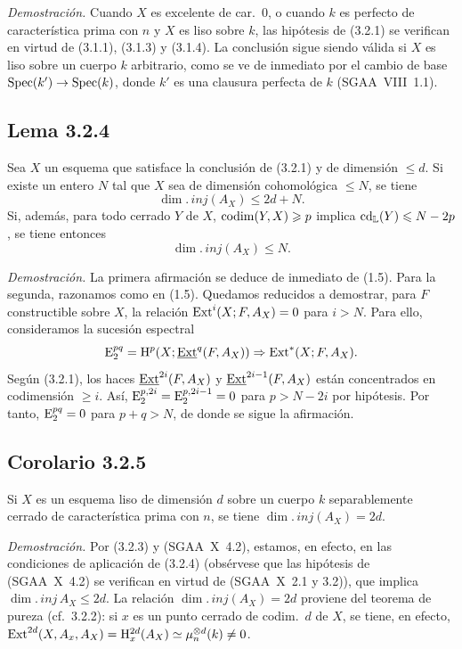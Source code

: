 \emph{Demostración.} Cuando $X$ es excelente de car.~0, o cuando $k$ es perfecto de característica prima con $n$ y $X$ es liso sobre $k$, las hipótesis de (3.2.1) se verifican en virtud de (3.1.1), (3.1.3) y (3.1.4). La conclusión sigue siendo válida si $X$ es liso sobre un cuerpo $k$ arbitrario, como se ve de inmediato por el cambio de base $\operatorname{Spec}(k') \to \operatorname{Spec}(k)$, donde $k'$ es una clausura perfecta de $k$ (SGAA~VIII~1.1).

\subsection*{Lema 3.2.4}
Sea $X$ un esquema que satisface la conclusión de (3.2.1) y de dimensión $\leqslant d$. Si existe un entero $N$ tal que $X$ sea de dimensión cohomológica $\leqslant N$, se tiene
\[
\dim.\,inj(A_X) \leqslant 2d + N.
\]
Si, además, para todo cerrado $Y$ de $X$, $\operatorname{codim}(Y,X) \geqslant p$ implica $\operatorname{cd}_{\mathbb{L}}(Y) \leqslant N - 2p$, se tiene entonces
\[
\dim.\,inj(A_X) \leqslant N.
\]

\emph{Demostración.} La primera afirmación se deduce de inmediato de (1.5). Para la segunda, razonamos como en (1.5). Quedamos reducidos a demostrar, para $F$ constructible sobre $X$, la relación $\operatorname{Ext}^i(X; F, A_X) = 0$ para $i > N$. Para ello, consideramos la sucesión espectral
\[
\mathrm{E}_2^{pq} = \mathrm{H}^p(X; \underline{\operatorname{Ext}}^q(F, A_X)) \Rightarrow \operatorname{Ext}^{*}(X; F, A_X).
\]
Según (3.2.1), los haces $\underline{\operatorname{Ext}}^{2i}(F, A_X)$ y $\underline{\operatorname{Ext}}^{2i-1}(F, A_X)$ están concentrados en codimensión $\geqslant i$. Así, $\mathrm{E}_2^{p,2i} = \mathrm{E}_2^{p,2i-1} = 0$ para $p > N - 2i$ por hipótesis. Por tanto, $\mathrm{E}_2^{pq} = 0$ para $p+q > N$, de donde se sigue la afirmación.

\subsection*{Corolario 3.2.5}
Si $X$ es un esquema liso de dimensión $d$ sobre un cuerpo $k$ separablemente cerrado de característica prima con $n$, se tiene $\dim.\,inj(A_X) = 2d$.

\emph{Demostración.} Por (3.2.3) y (SGAA~X~4.2), estamos, en efecto, en las condiciones de aplicación de (3.2.4) (obsérvese que las hipótesis de (SGAA~X~4.2) se verifican en virtud de (SGAA~X~2.1 y 3.2)), que implica $\dim.\,inj\, A_X \leqslant 2d$. La relación $\dim.\,inj(A_X) = 2d$ proviene del teorema de pureza (cf.~3.2.2): si $x$ es un punto cerrado de codim.~$d$ de $X$, se tiene, en efecto, $\operatorname{Ext}^{2d}(X, A_x, A_X) = \mathrm{H}^{2d}_x(A_X) \simeq \mu_n^{\otimes d}(k) \neq 0$.
